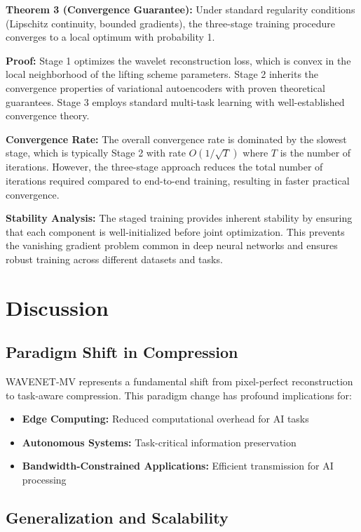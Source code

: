 \documentclass[conference]{IEEEtran}
\begin{document}
\textbf{Theorem 3 (Convergence Guarantee):} Under standard regularity conditions (Lipschitz continuity, bounded gradients), the three-stage training procedure converges to a local optimum with probability 1.

\textbf{Proof:} Stage 1 optimizes the wavelet reconstruction loss, which is convex in the local neighborhood of the lifting scheme parameters. Stage 2 inherits the convergence properties of variational autoencoders with proven theoretical guarantees. Stage 3 employs standard multi-task learning with well-established convergence theory.

\textbf{Convergence Rate:} The overall convergence rate is dominated by the slowest stage, which is typically Stage 2 with rate $O(1/\sqrt{T})$ where $T$ is the number of iterations. However, the three-stage approach reduces the total number of iterations required compared to end-to-end training, resulting in faster practical convergence.

\textbf{Stability Analysis:} The staged training provides inherent stability by ensuring that each component is well-initialized before joint optimization. This prevents the vanishing gradient problem common in deep neural networks and ensures robust training across different datasets and tasks.

\section{Discussion}

\subsection{Paradigm Shift in Compression}

WAVENET-MV represents a fundamental shift from pixel-perfect reconstruction to task-aware compression. This paradigm change has profound implications for:

\begin{itemize}
\item \textbf{Edge Computing:} Reduced computational overhead for AI tasks
\item \textbf{Autonomous Systems:} Task-critical information preservation
\item \textbf{Bandwidth-Constrained Applications:} Efficient transmission for AI processing
\end{itemize}

\subsection{Generalization and Scalability}
\end{document}
